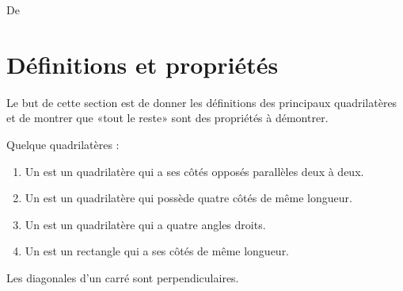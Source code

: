 

De \cite{NRHooXFvgpp5}

\section{Définitions et propriétés}

Le but de cette section est de donner les définitions des principaux quadrilatères et de montrer que «tout le reste» sont des propriétés à démontrer.
\begin{definition}
    Quelque quadrilatères :
    \begin{enumerate}
        \item
            Un  est un quadrilatère qui a ses côtés opposés parallèles deux à deux.
        \item
            Un  est un quadrilatère qui possède quatre côtés de même longueur.
        \item
            Un  est un quadrilatère qui a quatre angles droits.
        \item
            Un  est un rectangle qui a ses côtés de même longueur.
    \end{enumerate}
\end{definition}

\begin{propriete}
    Les diagonales d'un carré sont perpendiculaires.
\end{propriete}

